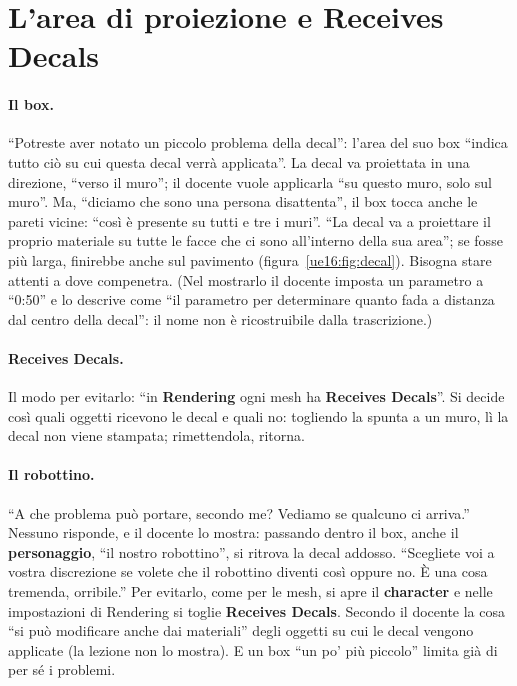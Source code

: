 \section{L'area di proiezione e Receives Decals}
\label{ue16:sec:proiezione}

\paragraph{Il box.} ``Potreste aver notato un piccolo problema della decal'': l'area del suo
box ``indica tutto ciò su cui questa decal verrà applicata''. La decal va proiettata in una
direzione, ``verso il muro''; il docente vuole applicarla ``su questo muro, solo sul muro''. Ma,
``diciamo che sono una persona disattenta'', il box tocca anche le pareti vicine: ``così è
presente su tutti e tre i muri''. ``La decal va a proiettare il proprio materiale su tutte le
facce che ci sono all'interno della sua area''; se fosse più larga, finirebbe anche sul
pavimento (figura~\ref{ue16:fig:decal}). Bisogna stare attenti a dove compenetra. (Nel mostrarlo
il docente imposta un parametro a ``0:50'' e lo descrive come ``il parametro per determinare
quanto fada a distanza dal centro della decal'': il nome non è ricostruibile dalla
trascrizione.)

\paragraph{Receives Decals.} Il modo per evitarlo: ``in \textbf{Rendering} ogni mesh ha
\textbf{Receives Decals}''. Si decide così quali oggetti ricevono le decal e quali no:
togliendo la spunta a un muro, lì la decal non viene stampata; rimettendola, ritorna.

\paragraph{Il robottino.} ``A che problema può portare, secondo me? Vediamo se qualcuno ci
arriva.'' Nessuno risponde, e il docente lo mostra: passando dentro il box, anche il
\textbf{personaggio}, ``il nostro robottino'', si ritrova la decal addosso. ``Scegliete voi a
vostra discrezione se volete che il robottino diventi così oppure no. È una cosa tremenda,
orribile.'' Per evitarlo, come per le mesh, si apre il \textbf{character} e nelle impostazioni
di Rendering si toglie \textbf{Receives Decals}. Secondo il docente la cosa ``si può modificare
anche dai materiali'' degli oggetti su cui le decal vengono applicate (la lezione non lo
mostra). E un box ``un po' più piccolo'' limita già di per sé i problemi.

